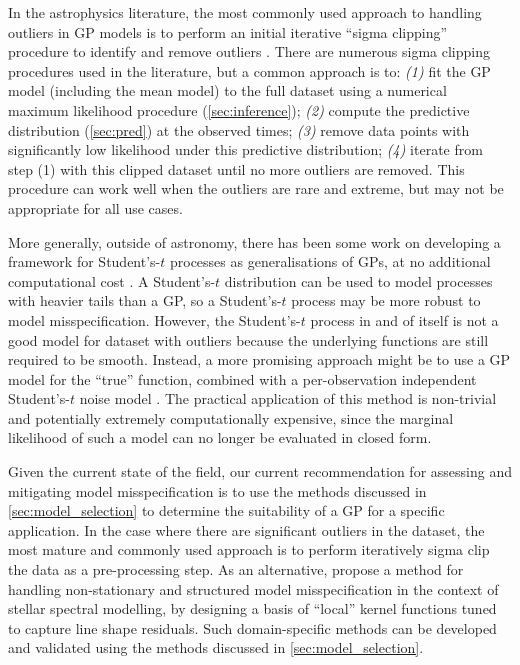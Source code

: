 \documentclass[letterpaper]{ar-1col}
\begin{document}
In the astrophysics literature, the most commonly used approach to handling outliers in GP models is to perform an initial iterative ``sigma clipping'' procedure to identify and remove outliers \citep[e.g.,][]{2019ApJ...885L..12D}.
There are numerous sigma clipping procedures used in the literature, but a common approach is to: \emph{(1)} fit the GP model (including the mean model) to the full dataset using a numerical maximum likelihood procedure (\autoref{sec:inference}); \emph{(2)} compute the predictive distribution (\autoref{sec:pred}) at the observed times; \emph{(3)} remove data points with significantly low likelihood under this predictive distribution; \emph{(4)} iterate from step (1) with this clipped dataset until no more outliers are removed.
This procedure can work well when the outliers are rare and extreme, but may not be appropriate for all use cases.

More generally, outside of astronomy, there has been some work on developing a framework for Student's-$t$ processes as generalisations of GPs, at no additional computational cost \citep[e.g.,][]{shah2014student, Tracey_2018}.
A Student's-$t$ distribution can be used to model processes with heavier tails than a GP, so a Student's-$t$ process may be more robust to model misspecification.
However, the Student's-$t$ process in and of itself is not a good model for dataset with outliers because the underlying functions are still required to be smooth.
Instead, a more promising approach might be to use a GP model for the ``true'' function, combined with a per-observation independent Student's-$t$ noise model \citep[e.g.,][]{NIPS2009_13fe9d84}.
The practical application of this method is non-trivial and potentially extremely computationally expensive, since the marginal likelihood of such a model can no longer be evaluated in closed form.

Given the current state of the field, our current recommendation for assessing and mitigating model misspecification is to use the methods discussed in \autoref{sec:model_selection} to determine the suitability of a GP for a specific application.
In the case where there are significant outliers in the dataset, the most mature and commonly used approach is to perform iteratively sigma clip the data as a pre-processing step.
As an alternative, \citet{2015ApJ...812..128C} propose a method for handling non-stationary and structured model misspecification in the context of stellar spectral modelling, by designing a basis of ``local'' kernel functions tuned to capture line shape residuals.
Such domain-specific methods can be developed and validated using the methods discussed in \autoref{sec:model_selection}.
\end{document}
